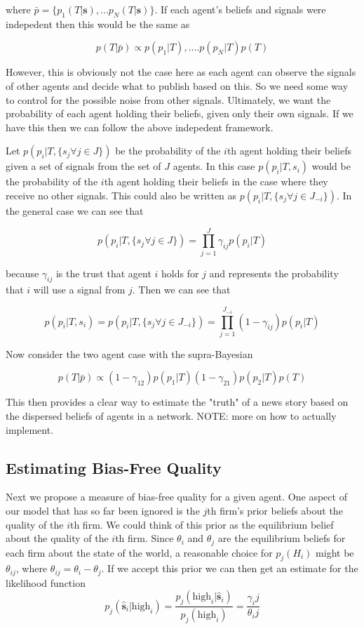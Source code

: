 \documentclass[a4paper]{article}
\begin{document}
where $\bar{p} = \{p_1(T | \textbf{s}), ... p_N(T | \textbf{s})\}$.  If each agent's beliefs and signals were indepedent then this would be the same as

\[p(T | \bar{p}) \propto p(p_1 | T), .... p(p_N | T) p(T)\]

However, this is obviously not the case here as each agent can observe the signals of other agents and decide what to publish based on this.  So we need some way to control for the possible noise from other signals.  Ultimately, we want the probability of each agent holding their beliefs, given only their own signals.  If we have this then we can follow the above indepedent framework.

Let $p(p_i | T, \{s_j \forall j \in J\})$ be the probability of the $i$th agent holding their beliefs given a set of signals from the set of $J$ agents.  In this case $p(p_i | T, s_i)$ would be the probability of the $i$th agent holding their beliefs in the case where they receive no other signals.  This could also be written as $p(p_i | T, \!\{s_j \forall j \in J_{-i}\})$.  In the general case we can see that 

\[p(p_i | T, \{s_j \forall j \in J\}) = \prod_{j=1}^J \gamma_{ij} p(p_i | T)\]

because $\gamma_{ij}$ is the trust that agent $i$ holds for $j$ and represents the probability that $i$ will use a signal from $j$.  Then we can see that

\[p(p_i | T, s_i) = p(p_i | T, \!\{s_j \forall j \in J_{-i}\}) = \prod_{j=1}^{J_{-i}} (1 - \gamma_{ij}) p(p_i | T)\]  

Now consider the two agent case with the supra-Bayesian

\[p(T | \bar{p}) \propto (1 - \gamma_{12}) p(p_1 | T) (1 - \gamma_{21}) p(p_2 | T)  p(T)\]

This then provides a clear way to estimate the "truth" of a news story based on the dispersed beliefs of agents in a network.  NOTE: more on how to actually implement.

\subsection{Estimating Bias-Free Quality}

Next we propose a measure of bias-free quality for a given agent.  One aspect of our model that has so far been ignored is the $j$th firm's prior beliefs about the quality of the $i$th firm. We could think of this prior as the equilibrium belief about the quality of the $i$th firm.  Since $\theta_i$ and $\theta_j$ are the equilibrium beliefs for each firm about the state of the world, a reasonable choice for $p_j(H_i)$ might be $\theta_{ij}$, where $\theta_{ij} = \theta_i - \theta_j$.
If we accept this prior we can then get an estimate for the likelihood function 
\[p_j(\hat{\textbf{s}}_i|\text{high}_i) = \frac{p_j(\text{high}_i|\hat{\textbf{s}}_i)}{p_j(\text{high}_i)} = \frac{\gamma_ij}{\theta_ij}\]
\end{document}
